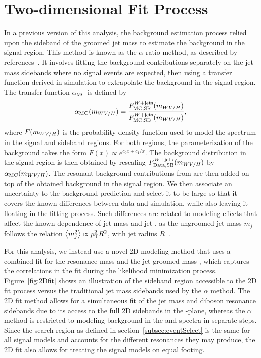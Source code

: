 
\section{Two-dimensional Fit Process}
\label{sec:2Dfit}

In a previous version of this analysis, the background estimation process relied upon the sideband of the groomed jet mass \MJ to estimate the background in the signal region.
This method is known as the $\alpha$ ratio method, as described by references~\cite{Khachatryan_14,Sirunyan_17}.
It involves fitting the background contributions separately on the jet mass sidebands where no signal events are expected, then using a transfer function derived in simulation to extrapolate the background in the signal region.
The transfer function $\alpha_\mathrm{MC}$ is defined by
\begin{equation}
  \alpha_\mathrm{MC}(m_{WV/H})=\frac{F_\mathrm{MC,SR}^{W+\text{jets}}(m_{WV/H})}{F_\mathrm{MC,SB}^{W+\text{jets}}(m_{WV/H})},
\end{equation}
where $F(m_{WV/H})$ is the probability density function used to model the \MVV spectrum in the signal and sideband regions.
For both regions, the parameterization of the background takes the form $F(x)\propto e^{c_0x+c_1/x}$.
The \Wjets background distribution in the signal region is then obtained by rescaling $F_\mathrm{Data,SB}^{W+\text{jets}}(m_{WV/H})$ by $\alpha_\mathrm{MC}(m_{WV/H})$.
The resonant background contributions from \WVt are then added on top of the obtained \Wjets background in the signal region.
We then associate an uncertainty to the background prediction and select it to be large so that it covers the known differences between data and simulation, while also leaving it floating in the fitting process.
Such differences are related to modeling effects that affect the known dependence of jet mass and jet \pt, as the ungroomed jet mass $m_j$ follows the relation $\ev{m_j^2}\propto\pt^2R^2$, with jet radius $R$~\cite{shelton2013tasi}.

For this analysis, we instead use a novel 2D modeling method that uses a combined fit for the resonance mass \MVV and the jet groomed mass \MJ, which captures the correlations in the fit during the likelihood minimization process.
Figure~\ref{fig:2Dfit} shows an illustration of the sideband region accessible to the 2D fit process versus the traditional jet mass sidebands used by the $\alpha$ method.
The 2D fit method allows for a simultaneous fit of the jet mass and diboson resonance sidebands due to its access to the full 2D sidebands in the \MVV-\MJ plane, whereas the $\alpha$ method is restricted to modeling background in the \MVV and \MJ spectra in separate steps.
Since the search region as defined in section~\ref{subsec:eventSelect} is the same for all signal models and accounts for the different resonances they may produce, the 2D fit also allows for treating the signal models on equal footing.

